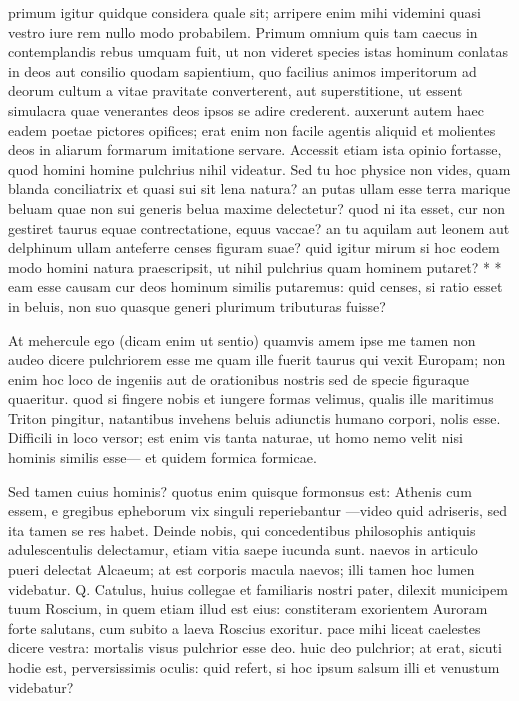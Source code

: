  primum igitur quidque considera quale sit; arripere enim mihi videmini quasi vestro iure rem nullo modo probabilem. Primum omnium quis tam caecus in contemplandis rebus umquam fuit, ut non videret species istas hominum conlatas in deos aut consilio quodam sapientium, quo facilius animos imperitorum ad deorum cultum a vitae pravitate converterent, aut superstitione, ut essent simulacra quae venerantes deos ipsos se adire crederent. auxerunt autem haec eadem poetae pictores opifices; erat enim non facile agentis aliquid et molientes deos in aliarum formarum imitatione servare. Accessit etiam ista opinio fortasse, quod homini homine pulchrius nihil videatur. Sed tu hoc physice non vides, quam blanda conciliatrix et quasi sui sit lena natura? an putas ullam esse terra marique beluam quae non sui generis belua maxime delectetur? quod ni ita esset, cur non gestiret taurus equae contrectatione, equus vaccae? an tu aquilam aut leonem aut delphinum ullam anteferre censes figuram suae? quid igitur mirum si hoc eodem modo homini natura praescripsit, ut nihil pulchrius quam hominem putaret? * * eam esse causam cur deos hominum similis putaremus: quid censes, si ratio esset in beluis, non suo quasque generi plurimum tributuras fuisse?

 At mehercule ego (dicam enim ut sentio) quamvis amem ipse me tamen non audeo dicere pulchriorem esse me quam ille fuerit taurus qui vexit Europam; non enim hoc loco de ingeniis aut de orationibus nostris sed de specie figuraque quaeritur. quod si fingere nobis et iungere formas velimus, qualis ille maritimus Triton pingitur, natantibus invehens beluis adiunctis humano corpori, nolis esse. Difficili in loco versor; est enim vis tanta naturae, ut homo nemo velit nisi hominis similis esse— et quidem formica formicae.

 Sed tamen cuius hominis? quotus enim quisque formonsus est: Athenis cum essem, e gregibus epheborum vix singuli reperiebantur —video quid adriseris, sed ita tamen se res habet. Deinde nobis, qui concedentibus philosophis antiquis adulescentulis delectamur, etiam vitia saepe iucunda sunt. naevos in articulo pueri delectat Alcaeum; at est corporis macula naevos; illi tamen hoc lumen videbatur. Q. Catulus, huius collegae et familiaris nostri pater, dilexit municipem tuum Roscium, in quem etiam illud est eius: constiteram exorientem Auroram forte salutans, cum subito a laeva Roscius exoritur. pace mihi liceat caelestes dicere vestra: mortalis visus pulchrior esse deo. huic deo pulchrior; at erat, sicuti hodie est, perversissimis oculis: quid refert, si hoc ipsum salsum illi et venustum videbatur?

